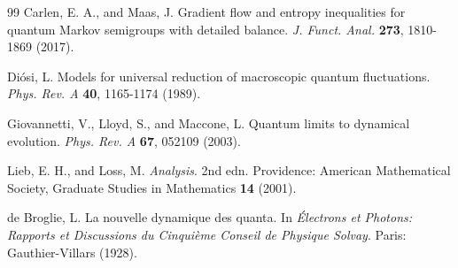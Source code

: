 \documentclass[11pt,a4paper]{article}
\numberwithin{equation}{section}
\theoremstyle{thmcompact}
\theoremstyle{remark}
\begin{document}
\begin{thebibliography}{99}
	Carlen, E. A., and Maas, J. Gradient flow and entropy inequalities for quantum Markov semigroups with detailed balance. \emph{J. Funct. Anal.} \textbf{273}, 1810-1869 (2017).
	
	Diósi, L. Models for universal reduction of macroscopic quantum fluctuations. \emph{Phys. Rev. A} \textbf{40}, 1165-1174 (1989).
	
	Giovannetti, V., Lloyd, S., and Maccone, L. Quantum limits to dynamical evolution. \emph{Phys. Rev. A} \textbf{67}, 052109 (2003).
	
	Lieb, E. H., and Loss, M. \emph{Analysis}. 2nd edn. Providence: American Mathematical Society, Graduate Studies in Mathematics \textbf{14} (2001).
	
	de Broglie, L. La nouvelle dynamique des quanta. In \emph{Électrons et Photons: Rapports et Discussions du Cinquième Conseil de Physique Solvay}. Paris: Gauthier-Villars (1928).
	
\end{thebibliography}
\end{document}
